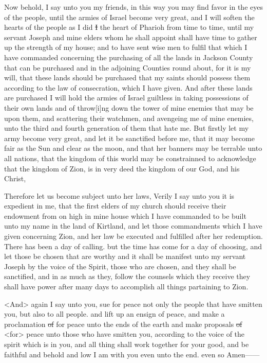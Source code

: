 					Now behold, I say unto you my friends, in this way you may find favor in the eyes of the people, until the armies of Israel become very great, and I will soften the hearts of the people as I did \sout{I} the heart of Pharioh from time to time, until my servant Joseph and mine elders whom he shall appoint shall have time to gather up the strength of my house; and to have sent wise men to fulfil that which I have commanded concerning the purchasing of all the lands in Jackson County that can be purchased and in the adjoining Counties round about, for it is my will, that these lands should be purchased that my saints should possess them according to the law of consecration, which I have given. And after these lands are purchased I will hold the armies of Israel guiltless in taking possessions of their own lands and of throw[i]ng down the tower of mine enemies that may be upon them, and scattering their watchmen, and avengeing me of mine enemies, unto the third and fourth generation of them that hate me. But firstly let my army become very great, and let it be sanctified before me, that it may become fair as the Sun and clear as the moon, and that her banners may be terrable unto all nations, that the kingdom of this world may be constrainned to acknowledge that the kingdom of Zion, is in very deed the kingdom of our God, and his Christ,
					
					Therefore let us become subject unto her laws, Verily I say unto you it is expedient in me, that the first elders of my church should receive their endowment from on high in mine house which I have commanded to be built unto my name in the land of Kirtland, and let those commandments which I have given concerning Zion, and her law be executed and fulfilled after her redemption. There has been a day of calling. but the time has come for a day of choosing, and let those be chosen that are worthy and it shall be manifest unto my servant Joseph by the voice of the Spirit, those who are chosen, and they shall be sanctified, and in as much as they, follow the counsels which they receive they shall have power after many days to accomplish all things partaining to Zion.
					
					<And> again I say unto you, sue for peace not only the people that have smitten you, but also to all people. and lift up an ensign of peace, and make a proclamation \sout{of} for peace unto the ends of the earth and make proposals \sout{of} <for> peace unto those who have smitten you, according to the voice of the spirit which is in you, and all thing shall work together for your good, and be faithful and behold and low I am with you even unto the end. even so Amen------
					
